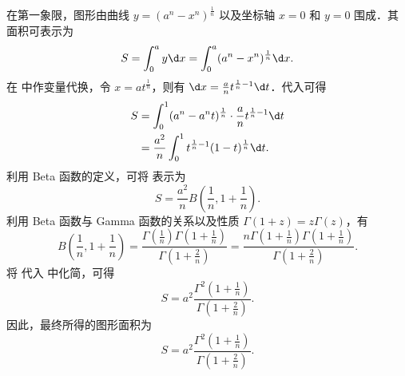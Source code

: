 \begin{solution}
    在第一象限，图形由曲线 $y = (a^n - x^n)^{\frac{1}{n}}$ 以及坐标轴 $x = 0$ 和 $y = 0$ 围成．其面积可表示为
    \begin{equation}\label{eq:area-integral}
        S = \int_{0}^{a} y \d x = \int_{0}^{a} (a^n - x^n)^{\frac{1}{n}} \d x.
    \end{equation}
    在  中作变量代换，令 $x = a t^{\frac{1}{n}}$，则有 $\d x = \frac{a}{n} t^{\frac{1}{n}-1} \d t$．代入可得
    \begin{equation}\label{eq:area-sub}
        \begin{aligned}
            S & = \int_{0}^{1} (a^n - a^n t)^{\frac{1}{n}} \cdot \frac{a}{n} t^{\frac{1}{n}-1} \d t \\
              & = \frac{a^2}{n} \int_{0}^{1} t^{\frac{1}{n}-1} (1-t)^{\frac{1}{n}} \d t.
        \end{aligned}
    \end{equation}
    利用 Beta 函数的定义，可将  表示为
    \begin{equation}\label{eq:area-beta}
        S = \frac{a^2}{n} B\left(\frac{1}{n}, 1 + \frac{1}{n}\right).
    \end{equation}
    利用 Beta 函数与 Gamma 函数的关系以及性质 $\Gamma(1+z) = z\Gamma(z)$，有
    \begin{equation}\label{eq:area-gamma}
        B\left(\frac{1}{n}, 1 + \frac{1}{n}\right) = \frac{\Gamma\left(\frac{1}{n}\right) \Gamma\left(1 + \frac{1}{n}\right)}{\Gamma\left(1 + \frac{2}{n}\right)} = \frac{n \Gamma\left(1 + \frac{1}{n}\right) \Gamma\left(1 + \frac{1}{n}\right)}{\Gamma\left(1 + \frac{2}{n}\right)}.
    \end{equation}
    将  代入  中化简，可得
    \begin{equation}\label{eq:area-simplify}
        S = a^2 \frac{\Gamma^2\left(1+\frac{1}{n}\right)}{\Gamma\left(1+\frac{2}{n}\right)}.
    \end{equation}
    因此，最终所得的图形面积为
    \begin{equation}\label{eq:area-final}
        S = \boxed{a^2 \frac{\Gamma^2\left(1+\frac{1}{n}\right)}{\Gamma\left(1+\frac{2}{n}\right)}}.
    \end{equation}
\end{solution}

